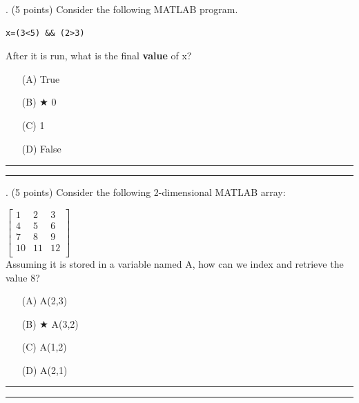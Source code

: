 \documentclass{article}
\begin{document}
\newpage
{}. (5 points)
Consider the following MATLAB program.
\begin{verbatim}
x=(3<5) && (2>3)
\end{verbatim}
After it is run, what is the final \textbf{value} of x?


\begin{enumerate}
\item[(A)]
True

\item[(B)] $\bigstar$ 
0

\item[(C)]
1

\item[(D)]
False

\end{enumerate}

\vspace*{2em}
\hrule
\vspace{2em}

\vspace{2em}
\hrule height 2pt


\newpage
{}. (5 points)
Consider the following 2-dimensional MATLAB array:

$ \left[ \begin{array}{ccc} 1 & 2 & 3 \\ 4 & 5 & 6 \\ 7 & 8 & 9 \\ 10 & 11 & 12 \\ \end{array} \right] $ \\

Assuming it is stored in a variable named A, how can we index and retrieve the value 8?


\begin{enumerate}
\item[(A)]
A(2,3)

\item[(B)] $\bigstar$ 
A(3,2)

\item[(C)]
A(1,2)

\item[(D)]
A(2,1)

\end{enumerate}

\vspace*{2em}
\hrule
\vspace{2em}

\vspace{2em}
\hrule height 2pt
\end{document}
